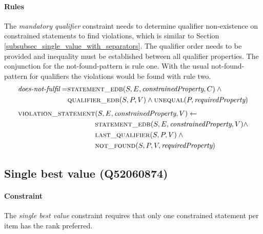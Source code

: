 \documentclass[hyperref,bachelorofscience,fleqn]{cgvpub}
\begin{document}
\paragraph{Rules}
The \emph{mandatory qualifier} constraint needs to determine qualifier non-existence on constrained statements to find violations, which is similar to Section \ref{subsubsec_single_value_with_separators}. The qualifier order needs to be provided and inequality must be established between all qualifier properties. The conjunction for the not-found-pattern is rule one. With the usual not-found-pattern for qualifiers the violations would be found with rule two.
\begin{align}
\begin{split}
\emph{does-not-fulfil} = &\textsc{statement\_edb}(S, E, \emph{constrainedProperty}, C) \wedge{} \\
&\textsc{qualifier\_edb}(S, P, V) \wedge \textsc{unequal}(P, \emph{requiredProperty})
\end{split}
\end{align}
\begin{align}
\begin{split}
\textsc{violation\_statement}&(S, E, \emph{constrainedProperty}, V) \leftarrow \\
&\textsc{statement\_edb}(S, E, \emph{constrainedProperty}, V) \wedge \\
&\textsc{last\_qualifier}(S, P, V) \wedge{} \\
&\textsc{not\_found}(S, P, V, \emph{requiredProperty})
\end{split}
\end{align}

 \subsection{Single best value (Q52060874)}\label{subsec_single_best_value}
\paragraph{Constraint}
The \emph{single best value} constraint requires that only one constrained statement per item has the rank preferred.
\end{document}

